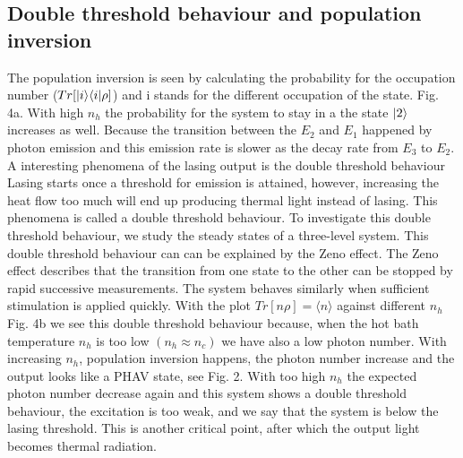 \documentclass[12pt,a4paper]{article}
\DeclarePairedDelimiter\bra{\langle}{\rvert}
\DeclarePairedDelimiter\ket{\lvert}{\rangle}
\begin{document}
\subsection{Double threshold behaviour and population inversion}
The population inversion is seen by calculating the probability for the occupation number ($Tr[\ket{i}\bra{i} \rho]$) and i stands for the different occupation of the state. Fig. 4a.  With high $n_h$ the probability for the system to stay in a the state $\ket{2}$ increases as well. Because the transition between the $E_2$ and $E_1$ happened by photon emission and this emission rate is slower as the decay rate from $E_3$ to $E_2$. 
A interesting phenomena of the lasing  output is the double threshold behaviour
Lasing starts once a threshold for emission is attained, however, increasing the heat flow too much will end up producing  thermal light instead of lasing. This phenomena is called a double threshold behaviour.\cite{Li2017}
To investigate this double threshold behaviour, we study the steady states of a three-level system.
This double threshold behaviour can can be explained by the Zeno effect. 
The Zeno effect describes that the transition from one state to the other can be stopped by rapid successive measurements. 
The system behaves similarly when sufficient stimulation is applied quickly. 
With the plot  $Tr[n\rho] =\langle n\rangle$ against different $n_h$ Fig. 4b we see this double threshold behaviour because, when the hot bath temperature $n_h$ is too low $(n_h \approx n_c)$ we have also a  low photon number. With increasing $n_h$, population inversion happens, the photon number increase and the output looks like a PHAV state,  see  Fig. 2. With too high $n_h$ the expected photon number decrease again and this system shows a double threshold behaviour, the excitation is too weak, and we say that the system is below the lasing threshold. This is another critical point, after which the output light becomes thermal radiation.\\
\end{document}

